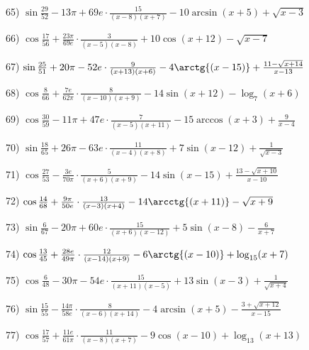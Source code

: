 \documentclass[11pt,ukrainian]{article}
\begin{document}
65) \space 
{ ${\sin\frac{29}{52}} - 13{\pi} + 69 e\cdot {\frac{15}{(x - 8)(x + 7)}} - {10\arcsin{(x + 5)}} + {\sqrt{x - 3}}$}
\smallskip\par
66) \space 
{ ${\cos\frac{17}{56}} + \frac{23{\pi}}{69 e}\cdot {\frac{3}{(x - 5)(x - 8)}} + {10\cos{(x + 12)}} - {\sqrt{x - 7}}$}
\smallskip\par
67) \space 
{ ${\sin\frac{25}{51}} + 20{\pi} - 52 e\cdot {\frac{9}{(x + 13)(x + 6)}} - {4\arctg{(x - 15)}} + {\frac{11 - \sqrt{x + 14}}{x - 13}}$}
\smallskip\par
68) \space 
{ ${\cos\frac{8}{66}} + \frac{7 e}{62{\pi}}\cdot {\frac{8}{(x - 10)(x + 9)}} - {14\sin{(x + 12)}} - {\log_{7}(x + 6)}$}
\smallskip\par
69) \space 
{ ${\cos\frac{30}{59}} - 11{\pi} + 47 e\cdot {\frac{7}{(x - 5)(x + 11)}} - {15\arccos{(x + 3)}} + { \frac{9}{x - 4}}$}
\smallskip\par
70) \space 
{ ${\sin\frac{18}{65}} + 26{\pi} - 63 e\cdot {\frac{11}{(x - 4)(x + 8)}} + {7\sin{(x - 12)}} + {\frac{1}{\sqrt{x - 3}}}$}
\smallskip\par
71) \space 
{ ${\cos\frac{27}{53}} - \frac{3 e}{70{\pi}}\cdot {\frac{5}{(x + 6)(x + 9)}} - {14\sin{(x - 15)}} + {\frac{13 - \sqrt{x + 10}}{x - 10}}$}
\smallskip\par
72) \space 
{ ${\cos\frac{14}{68}} + \frac{9{\pi}}{50 e}\cdot {\frac{13}{(x - 3)(x + 4)}} - {14\arcctg{(x + 11)}} - {\sqrt{x + 9}}$}
\smallskip\par
73) \space 
{ ${\sin\frac{6}{67}} - 20{\pi} + 60 e\cdot {\frac{15}{(x + 6)(x - 12)}} + {5\sin{(x - 8)}} - { \frac{6}{x + 7}}$}
\smallskip\par
74) \space 
{ ${\cos\frac{13}{45}} + \frac{28 e}{49{\pi}}\cdot {\frac{12}{(x - 14)(x + 9)}} - {6\arctg{(x - 10)}} + {\log_{15}(x + 7)}$}
\smallskip\par
75) \space 
{ ${\cos\frac{6}{48}} - 30{\pi} - 54 e\cdot {\frac{15}{(x + 11)(x - 5)}} + {13\sin{(x - 3)}} + {\frac{1}{\sqrt{x + 4}}}$}
\smallskip\par
76) \space 
{ ${\sin\frac{15}{55}} - \frac{14{\pi}}{58 e}\cdot {\frac{8}{(x - 6)(x + 14)}} - {4\arcsin{(x + 5)}} - {\frac{3 + \sqrt{x + 12}}{x - 15}}$}
\smallskip\par
77) \space 
{ ${\cos\frac{17}{57}} + \frac{11 e}{61{\pi}}\cdot {\frac{11}{(x - 8)(x + 7)}} - {9\cos{(x - 10)}} + {\log_{13}(x + 13)}$}
\smallskip\par
\end{document}
